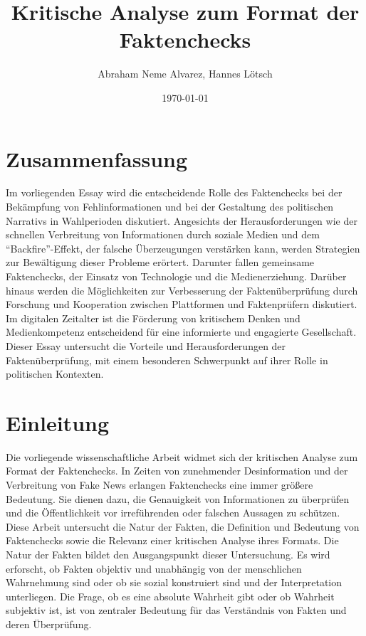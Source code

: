 \documentclass[a4paper,listof=totoc,bibliography=totoc]{scrartcl}
\title{Kritische Analyse zum Format der Faktenchecks}
\author{Abraham Neme Alvarez, Hannes Lötsch}
\date{\today}
\begin{document}
\maketitle

\section{Zusammenfassung}

Im vorliegenden Essay wird die entscheidende Rolle des Faktenchecks bei der 
Bekämpfung von Fehlinformationen und bei der Gestaltung des politischen Narrativs 
in Wahlperioden diskutiert. Angesichts der Herausforderungen wie der schnellen 
Verbreitung von Informationen durch soziale Medien und dem ``Backfire''-Effekt, 
der falsche Überzeugungen verstärken kann, werden Strategien zur Bewältigung 
dieser Probleme erörtert. Darunter fallen gemeinsame Faktenchecks, der Einsatz 
von Technologie und die Medienerziehung. Darüber hinaus werden die Möglichkeiten 
zur Verbesserung der Faktenüberprüfung durch Forschung und Kooperation zwischen 
Plattformen und Faktenprüfern diskutiert. Im digitalen Zeitalter ist die Förderung 
von kritischem Denken und Medienkompetenz entscheidend für eine informierte und 
engagierte Gesellschaft. Dieser Essay untersucht die Vorteile und Herausforderungen 
der Faktenüberprüfung, mit einem besonderen Schwerpunkt auf ihrer Rolle in 
politischen Kontexten.

\section{Einleitung}

Die vorliegende wissenschaftliche Arbeit widmet sich der kritischen Analyse 
zum Format der Faktenchecks. In Zeiten von zunehmender Desinformation und der 
Verbreitung von Fake News erlangen Faktenchecks eine immer größere Bedeutung. 
Sie dienen dazu, die Genauigkeit von Informationen zu überprüfen und die 
Öffentlichkeit vor irreführenden oder falschen Aussagen zu schützen. Diese 
Arbeit untersucht die Natur der Fakten, die Definition und Bedeutung von 
Faktenchecks sowie die Relevanz einer kritischen Analyse ihres Formats.
Die Natur der Fakten bildet den Ausgangspunkt dieser Untersuchung. Es wird 
erforscht, ob Fakten objektiv und unabhängig von der menschlichen Wahrnehmung 
sind oder ob sie sozial konstruiert sind und der Interpretation unterliegen. 
Die Frage, ob es eine absolute Wahrheit gibt oder ob Wahrheit subjektiv ist, 
ist von zentraler Bedeutung für das Verständnis von Fakten und deren Überprüfung.
\end{document}
